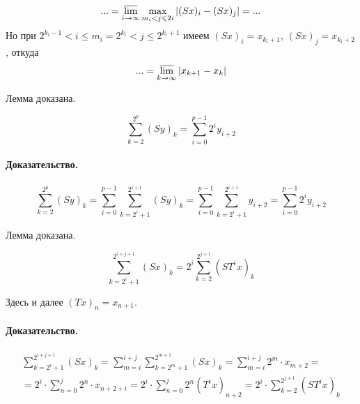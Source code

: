 \begin{equation*}
	... =
	\varlimsup_{i\to\infty}
		\max_{m_i < j \leq 2i } | (Sx)_i - (Sx)_j |
	=
	...
\end{equation*}
Но при $2^{k_i - 1} < i \leq m_i = 2^{k_i} < j \leq 2^{k_i+1}$
имеем $(Sx)_i = x_{k_i+1}$, $(Sx)_j = x_{k_i+2}$, откуда
\begin{equation}\label{alpha_S_sosedi}
	... =
	\varlimsup_{k\to\infty}
		| x_{k+1} - x_k |
\end{equation}

Лемма доказана.

\begin{lemma}
	\begin{equation}\label{summa_S_less}
		\sum_{k=2}^{2^p} (Sy)_k =
		\sum_{i=0}^{p-1} 2^i y_{i+2}
	\end{equation}
\end{lemma}

\paragraph{Доказательство.}

\begin{equation*}
	\sum_{k=2}^{2^p} (Sy)_k =
	\sum_{i=0}^{p-1} \sum_{k=2^i+1}^{2^{i+1}} (Sy)_k =
	\sum_{i=0}^{p-1} \sum_{k=2^i+1}^{2^{i+1}} y_{i+2} =
	\sum_{i=0}^{p-1} 2^i y_{i+2}
\end{equation*}

Лемма доказана.


\begin{lemma}
	\begin{equation}\label{summa_S}
		\sum_{k=2^i+1}^{2^{i+j+1}} (Sx)_k =
		2^i\sum_{k=2}^{2^{j+1}} (ST^ix)_k
	\end{equation}

	Здесь и далее $(Tx)_n = x_{n+1}$.
\end{lemma}

\paragraph{Доказательство.}

\begin{multline*}
	\sum_{k=2^i+1}^{2^{i+j+1}} (Sx)_k =
	\sum_{m = i}^{i+j}\sum_{k=2^m+1}^{2^{m+1}} (Sx)_k =
	\sum_{m = i}^{i+j}2^m \cdot x_{m+2} =
	\\=
	2^i \cdot \sum_{n = 0}^{j}2^n \cdot x_{n+2+i} =
	2^i \cdot \sum_{n = 0}^{j}2^n (T^i x)_{n+2} =
	2^i \cdot \sum_{k=2}^{2^{j+1}} (ST^i x)_k
\end{multline*}

